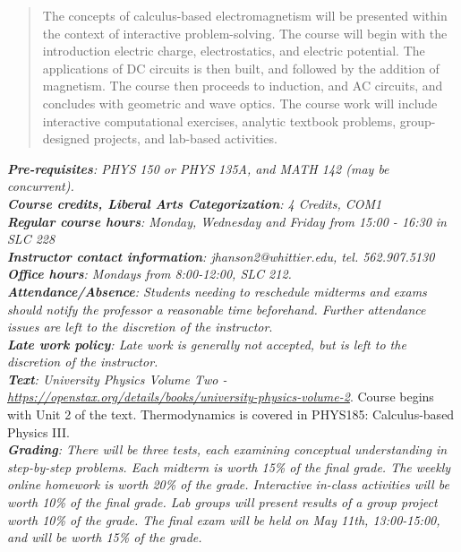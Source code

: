 \documentclass[10pt]{article}
\begin{document}
\maketitle

\begin{abstract}
The concepts of calculus-based electromagnetism will be presented within the context of interactive problem-solving.  The course will begin with the introduction electric charge, electrostatics, and electric potential.  The applications of DC circuits is then built, and followed by the addition of magnetism.  The course then proceeds to induction, and AC circuits, and concludes with geometric and wave optics.  The course work will include interactive computational exercises, analytic textbook problems, group-designed projects, and lab-based activities.
\end{abstract}
\noindent
\textit{\textbf{Pre-requisites}: PHYS 150 or PHYS 135A, and MATH 142 (may be concurrent).} \\
\textit{\textbf{Course credits, Liberal Arts Categorization}: 4 Credits, COM1} \\
\textit{\textbf{Regular course hours}: Monday, Wednesday and Friday from 15:00 - 16:30 in SLC 228} \\
\textit{\textbf{Instructor contact information}: jhanson2@whittier.edu, tel. 562.907.5130} \\
\textit{\textbf{Office hours}: Mondays from 8:00-12:00, SLC 212.} \\
\textit{\textbf{Attendance/Absence}: Students needing to reschedule midterms and exams should notify the professor a reasonable time beforehand. Further attendance issues are left to the discretion of the instructor}.\\ 
\textit{\textbf{Late work policy}: Late work is generally not accepted, but is left to the discretion of the instructor.} \\
\textit{\textbf{Text}: University Physics Volume Two - \url{https://openstax.org/details/books/university-physics-volume-2}}.  Course begins with Unit 2 of the text.  Thermodynamics is covered in PHYS185: Calculus-based Physics III. \\
\textit{\textbf{Grading}: There will be three tests, each examining conceptual understanding in step-by-step problems. Each
midterm is worth 15\% of the final grade. The weekly online homework is worth 20\% of the grade. Interactive
in-class activities will be worth 10\% of the final grade. Lab groups will present results of a group project worth 10\% of the grade.  The final exam will be held on May 11th, 13:00-15:00, and will be worth 15\% of the grade.} \\
\end{document}
